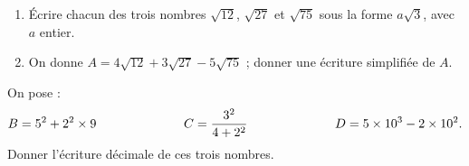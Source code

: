 \begin{myenumerate}
\item \begin{enumerate}
\item \'Ecrire chacun des trois nombres $\sqrt{12}$, $\sqrt{27}$ et $\sqrt{75}$	sous la forme $a\sqrt3$, avec $a$ entier.
\item On donne $A=4\sqrt{12} + 3\sqrt{27} - 5\sqrt{75}$ ; donner une écriture simplifiée de $A$.
\end{enumerate}
\item  On pose :
\[B= 5^2+2^2 \times 9\kern0.2\linewidth C=\frac{3^2}{4 + 2^2}\kern0.2\linewidth D= 5 \times 10^3 - 2 \times 10^2.\]
Donner l'écriture décimale de ces trois nombres.
\end{myenumerate}